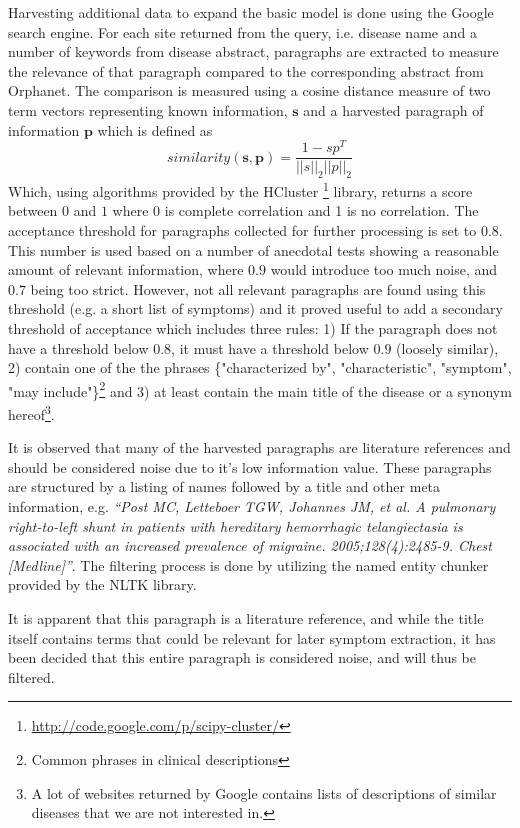 \documentclass[10pt,letterpaper,two column,final]{article}
\begin{document}
Harvesting additional data to expand the basic model is done using the
Google search engine. For each site returned from the query, i.e.
disease name and a number of keywords from disease abstract, paragraphs
are extracted to measure the relevance of that paragraph compared to the
corresponding abstract from Orphanet. The comparison is measured using a
cosine distance measure of two term vectors representing known
information, $\textbf{s}$ and a harvested paragraph of information
$\textbf{p}$ which is defined as
\[
similarity(\textbf{s}, \textbf{p}) = \frac{1 - sp^T}{||s||_2 ||p||_2}
\]
Which, using algorithms provided by the HCluster
\footnote{\url{http://code.google.com/p/scipy-cluster/}} library, returns
a score between $0$ and $1$ where 0 is complete correlation and 1 is
no correlation. The acceptance threshold for paragraphs collected for
further processing is set to $0.8$. This number is used based on a
number of anecdotal tests showing a reasonable amount of relevant
information, where $0.9$ would introduce too much noise, and $0.7$ being
too strict. However, not all relevant paragraphs are found using this threshold
(e.g. a short list of symptoms) and it proved useful to add a secondary threshold of
acceptance which includes three rules: 1) If the paragraph does not have a threshold below
$0.8$, it must have a threshold below $0.9$ (loosely similar), 2) contain one of the
the phrases \{"characterized by", "characteristic", "symptom", "may include"\}\footnote{Common phrases in clinical descriptions} and 3) at least contain the main title of the disease or a synonym hereof\footnote{A lot of websites returned by Google contains lists of descriptions of similar diseases that we are not interested in.}.

It is observed that many of the harvested paragraphs are literature
references and should be considered noise due to it's low information
value.
These paragraphs are structured by a listing of names followed by a
title and other meta information, e.g.
\textit{``Post MC, Letteboer TGW, Johannes JM, et al. A pulmonary
right-to-left shunt in patients with hereditary hemorrhagic
telangiectasia is associated with an increased prevalence of migraine.
2005;128(4):2485-9. Chest [Medline]''}. The filtering process is done by
utilizing the named entity chunker provided by the NLTK library.

It is apparent that this paragraph is a literature reference, and while
the title itself contains terms that could be relevant for later symptom
extraction, it has been decided that this entire paragraph is considered
noise, and will thus be filtered.
\end{document}
